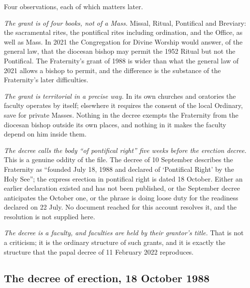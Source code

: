 Four observations, each of which matters later.

\emph{The grant is of four books, not of a Mass.} Missal, Ritual,
Pontifical and Breviary: the sacramental rites, the pontifical rites
including ordination, and the Office, as well as Mass. In 2021 the
Congregation for Divine Worship would answer, of the general law, that
the diocesan bishop may permit the 1952 Ritual but not the Pontifical.
The Fraternity's grant of 1988 is wider than what the general law of 2021
allows a bishop to permit, and the difference is the substance of the
Fraternity's later difficulties.

\emph{The grant is territorial in a precise way.} In its own churches and
oratories the faculty operates by itself; elsewhere it requires the
consent of the local Ordinary, save for private Masses. Nothing in the
decree exempts the Fraternity from the diocesan bishop outside its own
places, and nothing in it makes the faculty depend on him inside them.

\emph{The decree calls the body ``of pontifical right'' five weeks before
the erection decree.} This is a genuine oddity of the file. The decree of
10 September describes the Fraternity as ``founded July 18, 1988 and
declared of `Pontifical Right' by the Holy See''; the express erection
in pontifical right is dated 18 October. Either an earlier declaration
existed and has not been published, or the September decree anticipates
the October one, or the phrase is doing loose duty for the readiness
declared on 22 July. No document reached for this account
resolves it, and the resolution is not supplied here.

\emph{The decree is a faculty, and faculties are held by their grantor's
title.} That is not a criticism; it is the ordinary structure of such
grants, and it is exactly the structure that the papal decree of 11
February 2022 reproduces.

\subsection{The decree of erection, 18 October 1988}

